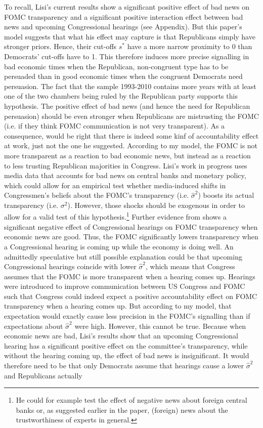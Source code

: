 \documentclass[paper=a4,12pt,DIV=11,twoside=false]{scrartcl}
\begin{document}

\noindent To recall, Lisi's current results show a significant positive effect of bad news on FOMC transparency and a significant positive interaction effect between bad news and upcoming Congressional hearings (see Appendix). But this paper's model suggests that what his effect may capture is that Republicans simply have stronger priors. Hence, their cut-offs $s^{*}$ have a more narrow proximity to 0 than Democrats' cut-offs have to 1. This therefore induces more precise signalling in bad economic times when the Republican, non-congruent type has to be persuaded than in good economic times when the congruent Democrats need persuasion. The fact that the sample 1993-2010 contains more years with at least one of the two chambers being ruled by the Republican party supports this hypothesis. The positive effect of bad news (and hence the need for Republican persuasion) should be even stronger when Republicans are mistrusting the FOMC (i.e. if they think FOMC communication is not very transparent). As a consequence, \citet{GL2017} would be right that there is indeed some kinf of accountability effect at work, just not the one he suggested. According to my model, the FOMC is not more transparent as a reaction to bad economic news, but instead as a reaction to less trusting Republican majorities in Congress. Lisi's work in progress uses media data that accounts for bad news on central banks and monetary policy, which could allow for an empirical test whether media-induced shifts in Congressmen's beliefs about the FOMC's transparency (i.e. $\hat{\sigma}^2$) boosts its actual transparency (i.e. $\sigma^2$). However, those shocks should be exogenous in order to allow for a valid test of this hypothesis.\footnote{He could for example test the effect of negative news about foreign central banks or, as suggested earlier in the paper, (foreign) news about the trustworthiness of experts in general.} Further evidence from \citet{GL2017} shows a significant negative effect of Congressional hearings on FOMC transparency when economic news are good. Thus, the FOMC significantly lowers transparency when a Congressional hearing is coming up while the economy is doing well. An admittedly speculative but still possible explanation could be that upcoming Congressional hearings coincide with lower $\hat{\sigma}^2$, which means that Congress assumes that the FOMC is more transparent when a hearing comes up. Hearings were introduced to improve communication between US Congress and FOMC such that Congress could indeed expect a positive accountability effect on FOMC transparency when a hearing comes up. But according to my model, that expectation would exactly cause less precision in the FOMC's signalling than if expectations about $\hat{\sigma}^2$ were high. However, this cannot be true. Because when economic news are bad, Lisi's results show that an upcoming Congressional hearing has a significant positive effect on the committee's transparency, while without the hearing coming up, the effect of bad news is insignificant. It would therefore need to be that only Democrats assume that hearings cause a lower $\hat{\sigma}^2$ and Republicans actually 
\end{document}
